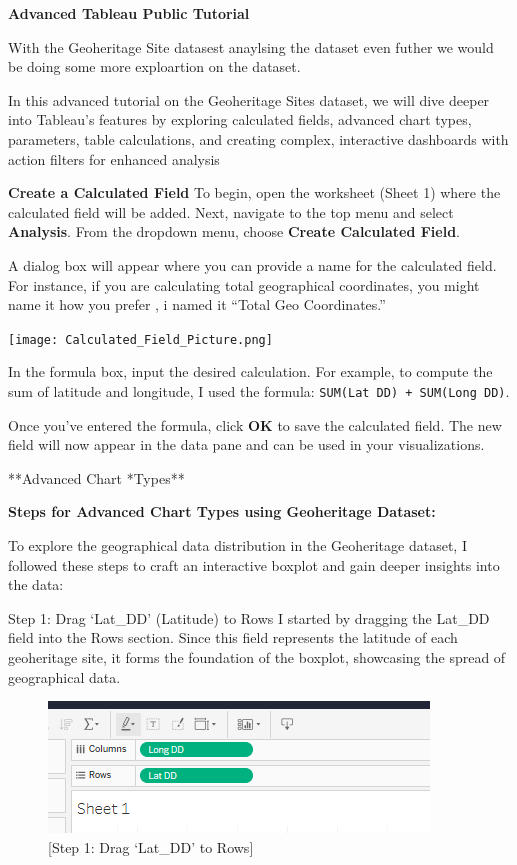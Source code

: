 \documentclass[
  letterpaper,
  DIV=11,
  numbers=noendperiod]{scrreprt}
\begin{document}
\textbf{Advanced Tableau Public Tutorial}

With the Geoheritage Site datasest anaylsing the dataset even futher we
would be doing some more exploartion on the dataset.

In this advanced tutorial on the Geoheritage Sites dataset, we will dive
deeper into Tableau's features by exploring calculated fields, advanced
chart types, parameters, table calculations, and creating complex,
interactive dashboards with action filters for enhanced analysis

\textbf{Create a Calculated Field} To begin, open the worksheet (Sheet
1) where the calculated field will be added. Next, navigate to the top
menu and select \textbf{Analysis}. From the dropdown menu, choose
\textbf{Create Calculated Field}.

A dialog box will appear where you can provide a name for the calculated
field. For instance, if you are calculating total geographical
coordinates, you might name it how you prefer , i named it ``Total Geo
Coordinates.''

\texttt{[image: Calculated\_Field\_Picture.png]}

In the formula box, input the desired calculation. For example, to
compute the sum of latitude and longitude, I used the formula:
\texttt{SUM(Lat\ DD)\ +\ SUM(Long\ DD)}.

Once you've entered the formula, click \textbf{OK} to save the
calculated field. The new field will now appear in the data pane and can
be used in your visualizations.

**Advanced Chart *Types**

\textbf{Steps for Advanced Chart Types using Geoheritage Dataset:}

To explore the geographical data distribution in the Geoheritage
dataset, I followed these steps to craft an interactive boxplot and gain
deeper insights into the data:

Step 1: Drag `Lat\_DD' (Latitude) to Rows I started by dragging the
Lat\_DD field into the Rows section. Since this field represents the
latitude of each geoheritage site, it forms the foundation of the
boxplot, showcasing the spread of geographical data.

\begin{figure}[H]

{\centering \includegraphics{Step1_ACT.png}

}

\caption{{[}Step 1: Drag `Lat\_DD' to Rows{]}}

\end{figure}%
\end{document}
